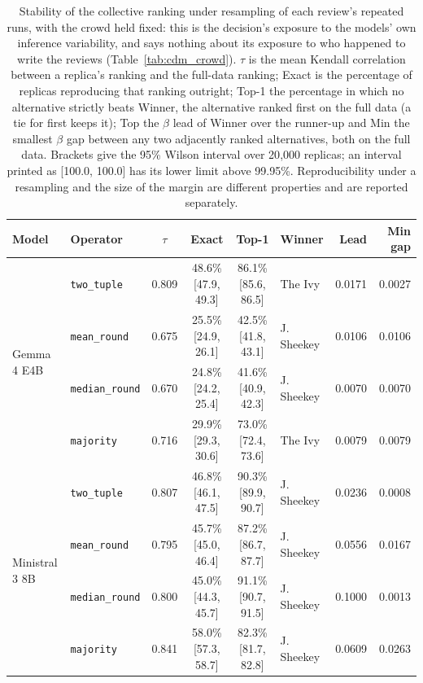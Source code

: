 \begin{table}[htbp]
\centering
\caption{Stability of the collective ranking under resampling of each review's repeated runs, with the crowd held fixed: this is the decision's exposure to the models' own inference variability, and says nothing about its exposure to who happened to write the reviews (Table~\ref{tab:cdm_crowd}). $\tau$ is the mean Kendall correlation between a replica's ranking and the full-data ranking; Exact is the percentage of replicas reproducing that ranking outright; Top-1 the percentage in which no alternative strictly beats Winner, the alternative ranked first on the full data (a tie for first keeps it); Top the $\beta$ lead of Winner over the runner-up and Min the smallest $\beta$ gap between any two adjacently ranked alternatives, both on the full data. Brackets give the 95\% Wilson interval over 20{,}000 replicas; an interval printed as [100.0, 100.0] has its lower limit above 99.95\%. Reproducibility under a resampling and the size of the margin are different properties and are reported separately.}
\label{tab:cdm_stability}
\small
\begin{tabular}{llccclrr}
\toprule
\textbf{Model} & \textbf{Operator} & \textbf{$\tau$} & \textbf{Exact} & \textbf{Top-1} & \textbf{Winner} & \textbf{Lead} & \textbf{Min gap} \\
\midrule
  \multirow{4}{*}{Gemma 4 E4B} & \texttt{two\_tuple} & 0.809 & 48.6\% \tiny[47.9, 49.3] & 86.1\% \tiny[85.6, 86.5] & The Ivy & 0.0171 & 0.0027 \\
   & \texttt{mean\_round} & 0.675 & 25.5\% \tiny[24.9, 26.1] & 42.5\% \tiny[41.8, 43.1] & J. Sheekey & 0.0106 & 0.0106 \\
   & \texttt{median\_round} & 0.670 & 24.8\% \tiny[24.2, 25.4] & 41.6\% \tiny[40.9, 42.3] & J. Sheekey & 0.0070 & 0.0070 \\
   & \texttt{majority} & 0.716 & 29.9\% \tiny[29.3, 30.6] & 73.0\% \tiny[72.4, 73.6] & The Ivy & 0.0079 & 0.0079 \\
\midrule
  \multirow{4}{*}{Ministral 3 8B} & \texttt{two\_tuple} & 0.807 & 46.8\% \tiny[46.1, 47.5] & 90.3\% \tiny[89.9, 90.7] & J. Sheekey & 0.0236 & 0.0008 \\
   & \texttt{mean\_round} & 0.795 & 45.7\% \tiny[45.0, 46.4] & 87.2\% \tiny[86.7, 87.7] & J. Sheekey & 0.0556 & 0.0167 \\
   & \texttt{median\_round} & 0.800 & 45.0\% \tiny[44.3, 45.7] & 91.1\% \tiny[90.7, 91.5] & J. Sheekey & 0.1000 & 0.0013 \\
   & \texttt{majority} & 0.841 & 58.0\% \tiny[57.3, 58.7] & 82.3\% \tiny[81.7, 82.8] & J. Sheekey & 0.0609 & 0.0263 \\

\end{tabular}
\end{table}
